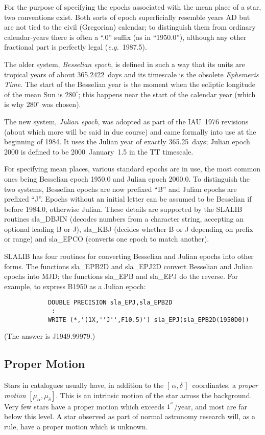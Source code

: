 \documentclass[11pt,twoside]{article}
\newcommand{\radec}     {$[\,\alpha,\delta\,]$}
\newcommand{\arcseci}[1] {$#1\hspace{-0.05em}$\raisebox{-0.5ex}
                         {$^{'\hspace{-0.1em}'}$}}
\renewcommand{\arcseci}[1] {$#1\hspace{-0.05em}^{'\hspace{-0.1em}'}$}
\begin{document}
For the purpose of specifying the epochs associated with the
mean place of a star, two conventions exist.  Both sorts of epoch
superficially resemble years AD but are not tied to the civil
(Gregorian) calendar;  to distinguish them from ordinary calendar-years
there is often
a ``.0'' suffix (as in ``1950.0''), although any other fractional
part is perfectly legal ({\it e.g.}\ 1987.5).

The older system,
{\it Besselian epoch}, is defined in such a way that its units are
tropical years of about 365.2422~days and its timescale is the
obsolete {\it Ephemeris Time}.
The start of the Besselian year is the moment
when the ecliptic longitude of the mean Sun is
$280^{\circ}$;  this happens near the start of the
calendar year (which is why $280^{\circ}$ was chosen).

The new system, {\it Julian epoch}, was adopted as
part of the IAU~1976 revisions (about which more will be said
in due course) and came formally into use at the
beginning of 1984.  It uses the Julian year of exactly
365.25~days; Julian epoch 2000 is defined to be 2000~January~1.5 in the
TT timescale.

For specifying mean places, various standard epochs are in use, the
most common ones being Besselian epoch 1950.0 and Julian epoch 2000.0.
To distinguish the two systems, Besselian epochs
are now prefixed ``B'' and Julian epochs are prefixed ``J''.
Epochs without an initial letter can be assumed to be Besselian
if before 1984.0, otherwise Julian.  These details are supported by
the SLALIB routines
sla\_DBJIN
(decodes numbers from a
character string, accepting an optional leading B or J),
sla\_KBJ
(decides whether B or J depending on prefix or range) and
sla\_EPCO
(converts one epoch to match another).

SLALIB has four routines for converting
Besselian and Julian epochs into other forms.
The functions
sla\_EPB2D
and
sla\_EPJ2D
convert Besselian and Julian epochs into MJD; the functions
sla\_EPB
and
sla\_EPJ
do the reverse.  For example, to express B1950 as a Julian epoch:
\goodbreak
\begin{verbatim}
            DOUBLE PRECISION sla_EPJ,sla_EPB2D
             :
            WRITE (*,'(1X,''J'',F10.5)') sla_EPJ(sla_EPB2D(1950D0))
\end{verbatim}
\goodbreak
(The answer is J1949.99979.)

\subsection{Proper Motion}
Stars in catalogues usually have, in addition to the
\radec\  coordinates, a {\it proper motion} $[\mu_\alpha,\mu_\delta]$.
This is an intrinsic motion
of the star across the background.  Very few stars have a
proper motion which exceeds \arcseci{1}/year, and most are
far below this level.  A star observed as part of normal
astronomy research will, as a rule, have a proper motion
which is unknown.
\end{document}
